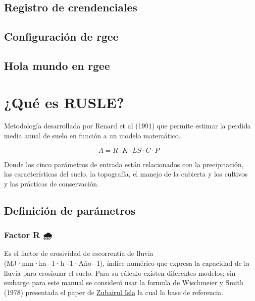 \documentclass[
  letterpaper,
  DIV=11,
  numbers=noendperiod]{scrreprt}
\begin{document}
\hypertarget{registro-de-crendenciales}{%
\section{Registro de crendenciales}\label{registro-de-crendenciales}}

\hypertarget{configuraciuxf3n-de-rgee}{%
\section{Configuración de rgee}\label{configuraciuxf3n-de-rgee}}

\hypertarget{hola-mundo-en-rgee}{%
\section{Hola mundo en rgee}\label{hola-mundo-en-rgee}}


\hypertarget{quuxe9-es-rusle}{%
\chapter{¿Qué es RUSLE?}\label{quuxe9-es-rusle}}

Metodología desarrollada por Renard et al (1991) que permite estimar la
perdida media anual de suelo en función a un modelo matemático.

\begin{equation}
    A = R \cdot K \cdot LS \cdot C \cdot P 
\end{equation}

Donde los cinco parámetros de entrada están relacionados con la
precipitación, las características del suelo, la topografía, el manejo
de la cubierta y los cultivos y las prácticas de conservación.

\hypertarget{definiciuxf3n-de-paruxe1metros}{%
\section{Definición de
parámetros}\label{definiciuxf3n-de-paruxe1metros}}

\hypertarget{factor-r}{%
\subsection{Factor R 🌧️}\label{factor-r}}

Es el factor de erosividad de escorrentía de lluvia
(MJ·mm·ha−1·h−1·Año−1), índice numérico que expresa la capacidad de la
lluvia para erosionar el suelo. Para su cálculo existen diferentes
modelos; sin embargo para este manual se consideró usar la formula de
Wischmeier y Smith (1978) presentada el paper de \href{}{Zubairul Isla}
la cual la base de referencia.
\end{document}
